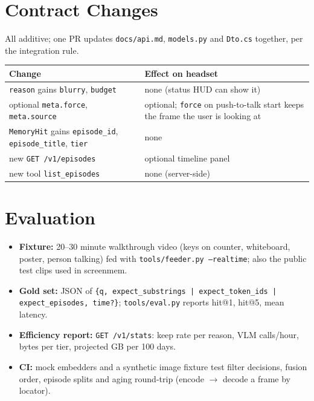 \documentclass[11pt,a4paper]{article}
\begin{document}
\section{Contract Changes}
All additive; one PR updates \texttt{docs/api.md}, \texttt{models.py} and \texttt{Dto.cs} together, per the integration rule.
\begin{table}[h]\centering\small
\begin{tabular}{P{4.2cm}P{9.8cm}}\toprule
\textbf{Change} & \textbf{Effect on headset}\\\midrule
\texttt{reason} gains \texttt{blurry}, \texttt{budget} & none (status HUD can show it)\\
optional \texttt{meta.force}, \texttt{meta.source} & optional; \texttt{force} on push-to-talk start keeps the frame the user is looking at\\
\texttt{MemoryHit} gains \texttt{episode\_id}, \texttt{episode\_title}, \texttt{tier} & none\\
new \texttt{GET /v1/episodes} & optional timeline panel\\
new tool \texttt{list\_episodes} & none (server-side)\\\bottomrule
\end{tabular}
\end{table}

\section{Evaluation}
\begin{itemize}
  \item \textbf{Fixture:} 20--30 minute walkthrough video (keys on counter, whiteboard, poster, person talking) fed with \texttt{tools/feeder.py --realtime}; also the public test clips used in screenmem.
  \item \textbf{Gold set:} JSON of \texttt{\{q, expect\_substrings | expect\_token\_ids | expect\_episodes, time?\}}; \texttt{tools/eval.py} reports hit@1, hit@5, mean latency.
  \item \textbf{Efficiency report:} \texttt{GET /v1/stats}: keep rate per reason, VLM calls/hour, bytes per tier, projected GB per 100 days.
  \item \textbf{CI:} mock embedders and a synthetic image fixture test filter decisions, fusion order, episode splits and aging round-trip (encode $\rightarrow$ decode a frame by locator).
\end{itemize}
\end{document}
